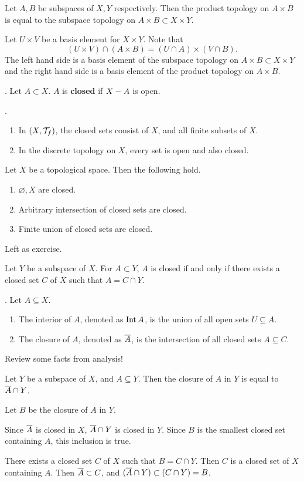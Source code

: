  Let \(A, B\) be subspaces of \(X, Y\) respectively. Then the product topology on \(A \times B\) is equal to the subspace topology on \(A \times B \subset X \times Y\).

\pf Let \(U \times V\) be a basis element for \(X \times Y\). Note that
\[
    (U\times V) \cap (A \times B) = (U\cap A) \times (V \cap B).
\]
The left hand side is a basis element of the subspace topology on \(A \times B \subset X \times Y\) and the right hand side is a basis element of the product topology on \(A \times B\).

\pagebreak


.  Let \(A \subset X\). \(A\) is \textbf{closed} if \(X - A\) is open.

\ex.
\begin{enumerate}
    \item In \((X, \mathcal{T}_f)\), the closed sets consist of \(X\), and all finite subsets of \(X\).
    \item In the discrete topology on \(X\), every set is open and also closed.
\end{enumerate}

 Let \(X\) be a topological space. Then the following hold.
\begin{enumerate}
    \item \(\varnothing, X\) are closed.
    \item Arbitrary intersection of closed sets are closed.
    \item Finite union of closed sets are closed.
\end{enumerate}

\pf Left as exercise.

 Let \(Y\) be a subspace of \(X\). For \(A \subset Y\), \(A\) is closed if and only if there exists a closed set \(C\) of \(X\) such that \(A = C \cap Y\).

.  Let \(A \subseteq X\).
\begin{enumerate}
    \item The interior of \(A\), denoted as \(\operatorname{Int}{A}\), is the union of all open sets \(U \subseteq A\).
    \item The closure of \(A\), denoted as \(\overline{A}\), is the intersection of all closed sets \(A \subseteq C\).
\end{enumerate}

Review some facts from analysis!

 Let \(Y\) be a subspace of \(X\), and \(A \subseteq Y\). Then the closure of \(A\) in \(Y\) is equal to \(\overline{A} \cap Y\).

\pf Let \(B\) be the closure of \(A\) in \(Y\).

\note{\(\subset\)} Since \(\overline{A}\) is closed in \(X\), \(\overline{A} \cap Y\) is closed in \(Y\). Since \(B\) is the smallest closed set containing \(A\), this inclusion is true.

\note{\(\supset\)} There exists a closed set \(C\) of \(X\) such that \(B = C \cap Y\). Then \(C\) is a closed set of \(X\) containing \(A\). Then \(\overline{A} \subset C\), and \((\overline{A} \cap Y) \subset (C \cap Y) = B\).

\pagebreak
